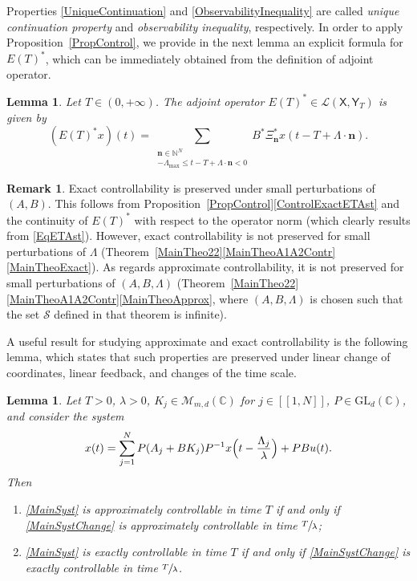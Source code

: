 \documentclass[10pt]{amsart}
\newcommand{\bn}{\boldsymbol{n}}
\newcommand{\llbracket}{[\![}
\newcommand{\rrbracket}{]\!]}
\theoremstyle{plain}
\newtheorem{lemm}[theo]{Lemma}
\theoremstyle{definition}
\newtheorem{remk}[theo]{Remark}
\begin{document}
Properties \eqref{UniqueContinuation} and \eqref{ObservabilityInequality} are called \emph{unique continuation property} and \emph{observability inequality}, respectively. In order to apply Proposition~\ref{PropControl}, we provide in the next lemma an explicit formula for $E(T)^\ast$, which can be immediately obtained from the definition of adjoint operator.

\begin{lemm}
\label{LemmETAdj}
Let $T \in (0, +\infty)$. The adjoint operator $E(T)^\ast \in \mathcal L(\mathsf X, \mathsf Y_T)$ is given by
\begin{equation}
\label{EqETAst}
(E(T)^\ast x)(t) = \sum_{\substack{\bn \in \mathbb N^N \\ -\Lambda_{\max} \leq t - T + \Lambda \cdot \bn < 0}} B^\ast \Xi_{\bn}^\ast x(t - T + \Lambda \cdot \bn).
\end{equation}
\end{lemm}

\begin{remk}
Exact controllability is preserved under small perturbations of $(A, B)$. This follows from Proposition~\ref{PropControl}\eqref{ControlExactETAst} and the continuity of $E(T)^\ast$ with respect to the operator norm (which clearly results from \eqref{EqETAst}). However, exact controllability is not preserved for small perturbations of $\Lambda$ (\cf Theorem~\ref{MainTheo22}\eqref{MainTheoA1A2Contr}\eqref{MainTheoExact}). As regards approximate controllability, it is not preserved for small perturbations of $(A, B, \Lambda)$ (\cf Theorem~\ref{MainTheo22}\eqref{MainTheoA1A2Contr}\eqref{MainTheoApprox}, where $(A, B, \Lambda)$ is chosen such that the set $\mathcal S$ defined in that theorem is infinite).
\end{remk}

A useful result for studying approximate and exact controllability is the following lem\-ma, which states that such properties are preserved under linear change of coordinates, linear feedback, and changes of the time scale.

\begin{lemm}
\label{LemmControlDelayInvariant}
Let $T > 0$, $\lambda > 0$, $K_j \in \mathcal M_{m, d}(\mathbb C)$ for $j \in \llbracket 1, N\rrbracket$, $P \in \mathrm{GL}_d(\mathbb C)$, and consider the system
\begin{equation}
\label{MainSystChange}
x(t) = \sum_{j=1}^N P(A_j + B K_j) P^{-1} x\Bigl(t - \frac{\Lambda_j}{\lambda}\Bigr) + P B u(t).
\end{equation}
Then
\begin{enumerate}
\item\label{ApproxContrlIff} \eqref{MainSyst} is approximately controllable in time $T$ if and only if \eqref{MainSystChange} is approximately controllable in time $\sfrac{T}{\lambda}$;

\item\label{ExactContrlIff} \eqref{MainSyst} is exactly controllable in time $T$ if and only if \eqref{MainSystChange} is exactly controllable in time $\sfrac{T}{\lambda}$.
\end{enumerate}
\end{lemm}
\end{document}
